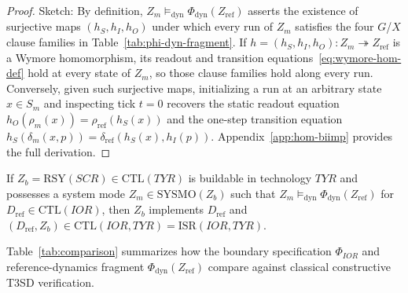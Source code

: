 \begin{proof}
Sketch: By definition, $Z_m\models_{\mathrm{dyn}}\Phi_{\mathrm{dyn}}(Z_{\mathrm{ref}})$ asserts the existence of surjective maps $(h_S,h_I,h_O)$ under which every run of $Z_m$ satisfies the four $G$/$X$ clause families in Table~\ref{tab:phi-dyn-fragment}. If $h=(h_S,h_I,h_O):Z_m\twoheadrightarrow Z_{\mathrm{ref}}$ is a Wymore homomorphism, its readout and transition equations~\eqref{eq:wymore-hom-def} hold at every state of $Z_m$, so those clause families hold along every run. Conversely, given such surjective maps, initializing a run at an arbitrary state $x\in S_m$ and inspecting tick $t=0$ recovers the static readout equation $h_O(\rho_m(x))=\rho_{\mathrm{ref}}(h_S(x))$ and the one-step transition equation $h_S(\delta_m(x,p))=\delta_{\mathrm{ref}}(h_S(x),h_I(p))$. Appendix~\ref{app:hom-biimp} provides the full derivation.
\end{proof}

\begin{corollary}
\label{cor:cotyledon-implementability}
If $Z_b=\mathrm{RSY}(SCR)\in\mathrm{CTL}(TYR)$ is buildable in technology $TYR$ and possesses a system mode $Z_m\in\mathrm{SYSMO}(Z_b)$ such that $Z_m\models_{\mathrm{dyn}}\Phi_{\mathrm{dyn}}(Z_{\mathrm{ref}})$ for $D_{\mathrm{ref}}\in\mathrm{CTL}(IOR)$, then $Z_b$ implements $D_{\mathrm{ref}}$ and $(D_{\mathrm{ref}},Z_b)\in\mathrm{CTL}(IOR,TYR)=\mathrm{ISR}(IOR,TYR)$.
\end{corollary}

Table~\ref{tab:comparison} summarizes how the boundary specification $\Phi_{IOR}$ and reference-dynamics fragment $\Phi_{\mathrm{dyn}}(Z_{\mathrm{ref}})$ compare against classical constructive T3SD verification.


